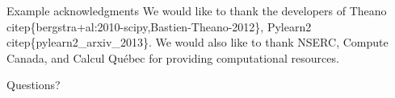 \documentclass[utf8x,xcolor=pdftex,dvipsnames,table]{beamer}
\begin{document}
\begin{frame}{Example acknowledgments}
We would like to thank the developers of
Theano \\citep\{bergstra+al:2010-scipy,Bastien-Theano-2012\},
Pylearn2 \\citep\{pylearn2\_arxiv\_2013\}. We would also like
to thank NSERC, Compute Canada, and Calcul Qu\'ebec
for providing computational resources.
\end{frame}


\begin{frame}
\begin{center}

\Huge
Questions?
\end{center}
\end{frame}
\end{document}
